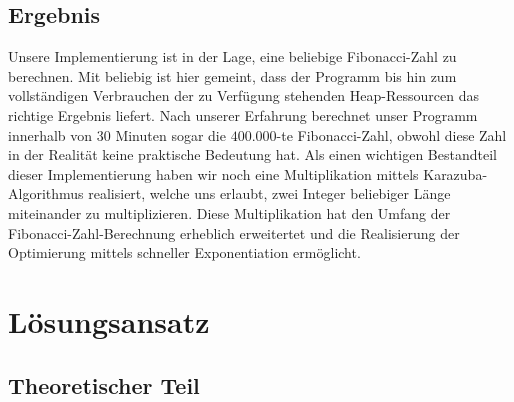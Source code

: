 \documentclass[course=erap]{aspdoc}
\begin{document}
\subsection{Ergebnis}
Unsere Implementierung ist in der Lage, eine \glqq beliebige\grqq{} Fibonacci-Zahl zu berechnen. Mit \glqq beliebig\grqq{} ist hier gemeint, dass der Programm bis hin zum vollständigen Verbrauchen der zu Verfügung stehenden Heap-Ressourcen das richtige Ergebnis liefert. Nach unserer Erfahrung berechnet unser Programm innerhalb von 30 Minuten sogar die $400.000$-te Fibonacci-Zahl, obwohl diese Zahl in der Realität keine praktische Bedeutung hat. Als einen wichtigen Bestandteil dieser Implementierung haben wir noch eine Multiplikation mittels Karazuba-Algorithmus realisiert, welche uns erlaubt, zwei Integer beliebiger Länge miteinander zu multiplizieren. Diese Multiplikation hat den Umfang der Fibonacci-Zahl-Berechnung erheblich erweitertet und die Realisierung der Optimierung mittels schneller Exponentiation ermöglicht.

\section{Lösungsansatz}
\subsection{Theoretischer Teil}
\end{document}
